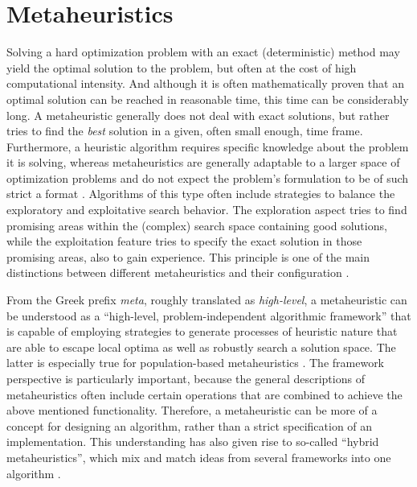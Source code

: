 \section{Metaheuristics}
\label{chap:meta}

Solving a hard optimization problem with an exact (deterministic) method may yield the optimal solution to the problem, but often at the cost of high computational intensity. And although it is often mathematically proven that an optimal solution can be reached in reasonable time, this time can be considerably long. A metaheuristic generally does not deal with exact solutions, but rather tries to find the \textit{best} solution in a given, often small enough, time frame. 
Furthermore, a heuristic algorithm requires specific knowledge about the problem it is solving, whereas metaheuristics are generally adaptable to a larger space of optimization problems and do not expect the problem's formulation to be of such strict a format \cite{sorensen2013metaheuristics}. 
Algorithms of this type often include strategies to balance the exploratory and exploitative search behavior. The exploration aspect tries to find promising areas within the (complex) search space containing good solutions, while the exploitation feature tries to specify the exact solution in those promising areas, also to gain experience. This principle is one of the main distinctions between different metaheuristics and their configuration \cite{boussaid2013survey}.

From the Greek prefix \textit{meta}, roughly translated as \textit{high-level}, a metaheuristic can be understood as a \enquote{high-level, problem-independent algorithmic framework} \cite{sorensen2013metaheuristics} that is capable of employing strategies to generate processes of heuristic nature that are able to escape local optima as well as robustly search a solution space. The latter is especially true for population-based metaheuristics \cite{gendreau2010handbook}. 
The framework perspective is particularly important, because the general descriptions of metaheuristics often include certain operations that are combined to achieve the above mentioned functionality. Therefore, a metaheuristic can be more of a concept for designing an algorithm, rather than a strict specification of an implementation. This understanding has also given rise to so-called \enquote{hybrid metaheuristics}, which mix and match ideas from several frameworks into one algorithm \cite{sorensen2018history}.

